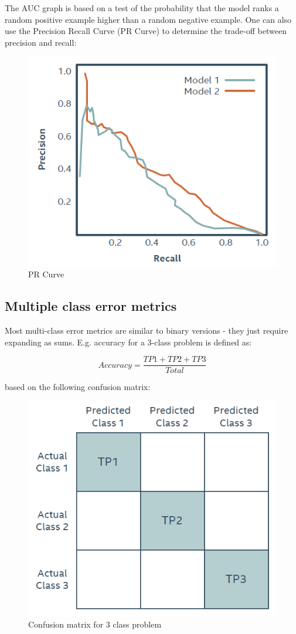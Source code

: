 \documentclass[11pt]{book}
\begin{document}
The AUC graph is based on a test of the probability that the model ranks a random positive example higher than a random negative example. One can also use the Precision Recall Curve (PR Curve) to determine the trade-off between precision and recall:

\begin{figure}[H]
    \centering
    \includegraphics[width=0.5\linewidth]{pr.PNG}
    \caption{PR Curve}
    \label{fig:my_label}
\end{figure}

\subsection{Multiple class error metrics}

Most multi-class error metrics are similar to binary versions - they just require expanding as sums. E.g. accuracy for a 3-class problem is defined as:

\begin{equation}
    Accuracy=\frac{TP1+TP2+TP3}{Total}
\end{equation}

based on the following confusion matrix:

\begin{figure}[H]
    \centering
    \includegraphics[width=0.5\linewidth]{confusion3.PNG}
    \caption{Confusion matrix for 3 class problem}
    \label{fig:my_label}
\end{figure}
\end{document}
